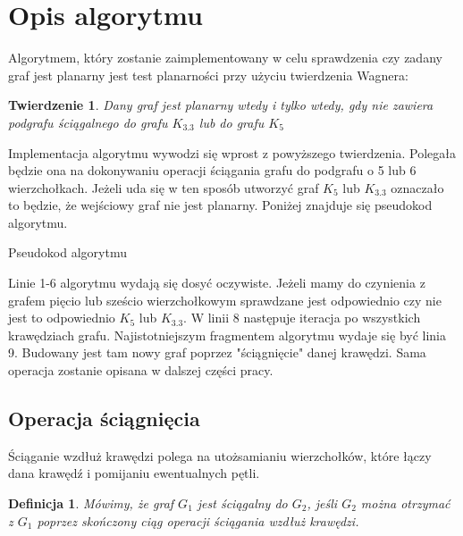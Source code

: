 \documentclass[a4 122pt]{article}
\newtheorem{twierdzenie}{Twierdzenie}
\newtheorem{definicja}{Definicja}
\newenvironment{algorytm}[1][htb]
  {\renewcommand{\algorithmcfname}{Algorytm}%
   \begin{algorithm}[#1]%
  }{\end{algorithm}}
\begin{document}
	\section{Opis algorytmu}	
	Algorytmem, który zostanie zaimplementowany w celu sprawdzenia czy zadany graf jest planarny jest test planarności przy użyciu twierdzenia Wagnera: 
	\begin{twierdzenie}
	Dany graf jest planarny wtedy i tylko wtedy, gdy nie zawiera podgrafu ściągalnego do grafu $K_{3.3}$ lub do grafu $ K_5 $
	\end{twierdzenie}
	Implementacja algorytmu wywodzi się wprost z powyższego twierdzenia. 
	Polegała będzie ona na dokonywaniu operacji ściągania grafu do podgrafu o 5 lub 6 wierzchołkach.
	Jeżeli uda się w ten sposób utworzyć graf $ K_5 $ lub $K_{3.3}$ oznaczało to będzie, że wejściowy graf nie jest planarny.
	Poniżej znajduje się pseudokod algorytmu.
	
	\begin{algorytm}[H]
	\newcommand{\forcond}{$i=0$ \KwTo $n$}
	\caption{Pseudokod algorytmu}
	\end{algorytm}
	
	Linie 1-6 algorytmu wydają się dosyć oczywiste. 
	Jeżeli mamy do czynienia z grafem pięcio lub sześcio wierzchołkowym sprawdzane jest odpowiednio czy nie jest to odpowiednio $K_5$ lub $K_{3.3}$. 
	W linii 8 następuje iteracja po wszystkich krawędziach grafu. 
	Najistotniejszym fragmentem algorytmu wydaje się być linia 9. 
	Budowany jest tam nowy graf poprzez "ściągnięcie" danej krawędzi. 
	Sama operacja zostanie opisana w dalszej części pracy.
	
	\subsection{Operacja ściągnięcia}
		Ściąganie wzdłuż krawędzi polega na utożsamianiu wierzchołków, które łączy dana krawędź i pomijaniu ewentualnych pętli. 
 		
		\begin{definicja}
			Mówimy, że graf $G_1$ jest ściągalny do $G_2$, jeśli $G_2$ można otrzymać z $G_1$ poprzez skończony ciąg operacji ściągania wzdłuż krawędzi.
		\end{definicja}
		
\end{document}
